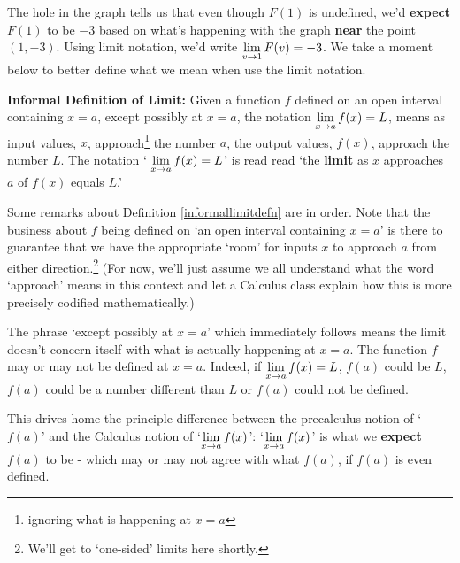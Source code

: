 \documentclass{ximera}
\begin{document}
The hole in the graph tells us that even though $F(1)$ is undefined, we'd \textbf{expect} $F(1)$ to be $-3$ based on what's happening with the graph \textbf{near} the point $(1,-3)$.  Using limit notation, we'd write  $\ds{\lim_{v \rightarrow 1} F(v) = -3}$.  We take a moment below to better define what we mean when use the limit notation.

\medskip

\colorbox{ResultColor}{\bbm

\begin{defn} \label{informallimitdefn} \textbf{Informal Definition of Limit:}  Given a function $f$ defined on an open interval containing $x=a$, except possibly at $x=a$, the notation $\ds{\lim_{x \rightarrow a} f(x) = L}$, means as input values, $x$, approach\footnote{ignoring what is happening at $x=a$} the number $a$, the output values, $f(x)$, approach the number $L$.  The notation ` $\ds{\lim_{x \rightarrow a} f(x) = L}$'  is read read `the \textbf{limit} as $x$ approaches $a$ of $f(x)$ equals $L$.' 
\end{defn}

\ebm}


\medskip


Some remarks about Definition \ref{informallimitdefn} are in order.  Note that the business about $f$ being defined on `an open interval containing $x=a$'  is there to guarantee that we have the appropriate `room' for inputs $x$ to approach $a$ from either direction.\footnote{We'll get to `one-sided' limits here shortly.}  (For now, we'll just assume we all understand what the word `approach' means in this context and let a Calculus class explain how this is more precisely codified mathematically.)

\medskip 

The phrase  `except possibly at $x=a$' which immediately follows means the limit doesn't concern itself with what is actually happening at $x=a$.  The function  $f$ may or may not be defined at $x = a$.  Indeed,  if  $\ds{\lim_{x \rightarrow a} f(x) = L}$, $f(a)$ could be $L$, $f(a)$  could be a number different than $L$ or $f(a)$ could not be defined. 

\medskip

 This drives home the principle difference between the precalculus notion of `$f(a)$' and the Calculus notion of  `$\ds{\lim_{x \rightarrow a} f(x)}$':  `$\ds{\lim_{x \rightarrow a} f(x)}$' is what we \textbf{expect} $f(a)$ to be - which may or may not agree with what $f(a)$, if $f(a)$ is even defined. 
\end{document}
